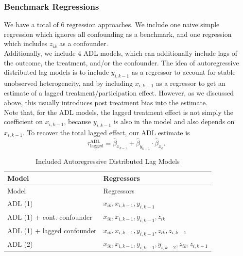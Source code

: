 \documentclass[
  letterpaper,
  DIV=11,
  numbers=noendperiod]{scrartcl}
\begin{document}
\subsubsection{Benchmark Regressions}\label{benchmark-regressions}

We have a total of 6 regression approaches. We include one naive simple
regression which ignores all confounding as a benchmark, and one
regression which includes \(z_{ik}\) as a confounder.\\
Additionally, we include 4 ADL models, which can additionally include
lags of the outcome, the treatment, and/or the confounder. The idea of
autoregressive distributed lag models is to include \(y_{i, k-1}\) as a
regressor to account for stable unobserved heterogeneity, and by
including \(x_{i, k-1}\) as a regressor to get an estimate of a lagged
treatment/participation effect. However, as we discussed above, this
usually introduces post treatment bias into the estimate.\\
Note that, for the ADL models, the lagged treatment effect is not simply
the coefficient on \(x_{i,k-1}\), because \(y_{i,k-1}\) is also in the
model and also depends on \(x_{i,k-1}\). To recover the total lagged
effect, our ADL estimate is
\[ \tau_{\text{lagged}}^{\text{ADL}} = \hat\beta_{x_{k-1}} +\hat\beta_{y_{k-1}}\cdot \hat\beta_{x_k}. \]

\begin{longtable}[]{@{}
  >{\raggedright\arraybackslash}p{}
  >{\raggedright\arraybackslash}p{}@{}}
\caption{Included Autoregressive Distributed Lag Models}\tabularnewline
\toprule\noalign{}
\begin{minipage}[b]{\linewidth}\raggedright
Model
\end{minipage} & \begin{minipage}[b]{\linewidth}\raggedright
Regressors
\end{minipage} \\
\midrule\noalign{}
\endfirsthead
\toprule\noalign{}
\begin{minipage}[b]{\linewidth}\raggedright
Model
\end{minipage} & \begin{minipage}[b]{\linewidth}\raggedright
Regressors
\end{minipage} \\
\midrule\noalign{}
\endhead
\bottomrule\noalign{}
\endlastfoot
ADL (1) & \(x_{ik}, x_{i,k-1}, y_{i,k-1}\) \\
ADL (1) + cont. confounder & \(x_{ik}, x_{i,k-1}, y_{i,k-1}, z_{ik}\) \\
ADL (1) + lagged confounder &
\(x_{ik}, x_{i,k-1}, y_{i,k-1}, z_{ik}, z_{i,k-1}\) \\
ADL (2) &
\(x_{ik}, x_{i,k-1}, y_{i,k-1}, y_{i,k-2}, z_{ik}, z_{i,k-1}\) \\
\end{longtable}
\end{document}
